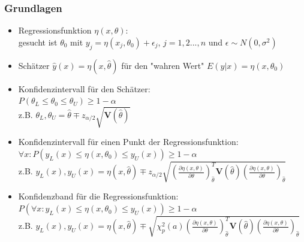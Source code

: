 \documentclass[aspectratio=1610, 9pt]{beamer}
\begin{document}
\begin{frame}
  \frametitle{Grundlagen}
  \begin{itemize}
    \item Regressionsfunktion $\eta(x, \theta)$: \\ 
    gesucht ist $\theta_0$ mit $y_j = \eta(x_j, \theta_0) + \epsilon_j$, $j = 1,2...,n$ und $\epsilon \sim N(0, \sigma^2)$ \\
    \item Schätzer $\hat{y}(x) = \eta(x, \hat\theta)$ für den "wahren Wert" $E(y|x) = \eta(x, \theta_0)$ \\
    \item Konfidenzintervall für den Schätzer: \\
    $P\left( \theta_L \le \theta_0 \le \theta_U \right) \geq 1-\alpha$
    \\
    z.B. $\theta_L, \theta_U = \hat\theta \mp z_{\alpha/2}\sqrt{\mathbf{V}(\hat\theta)}$
    \\
    \item Konfidenzintervall für einen Punkt der Regressionsfunktion: \\
    $\forall x: P\left(y_L(x) \le \eta(x, \theta_0) \le y_U(x)\right) \geq 1-\alpha$
    \\
    z.B. $y_L(x), y_U(x) = \eta(x, \hat\theta) \mp 
    z_{\alpha/2}
    \sqrt{
      \left(
        \frac{\partial\eta(x, \theta)}{\partial\theta}
      \right)_{\hat\theta}^T
      \mathbf{V}(\hat\theta)
      \left(
        \frac{\partial\eta(x, \theta)}{\partial\theta}
      \right)_{\hat\theta}
    }$
    \item Konfidenzband für die Regressionsfunktion: \\
    $P\left(\forall x: y_L(x) \le \eta(x, \theta_0) \le y_U(x) \right ) \geq 1-\alpha$
    \\
    z.B. $y_L(x), y_U(x) = \eta(x, \hat\theta) \mp 
    \sqrt{
      \chi_p^2(a)
      \left(
        \frac{\partial\eta(x, \theta)}{\partial\theta}
      \right)_{\hat\theta}^T
      \mathbf{V}(\hat\theta)
      \left(
        \frac{\partial\eta(x, \theta)}{\partial\theta}
      \right)_{\hat\theta}
    }$
  \end{itemize}
\end{frame}
\end{document}
